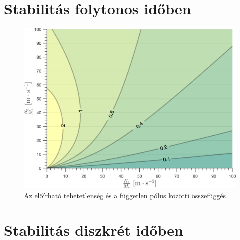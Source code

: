 \section{Stabilitás folytonos időben}
\begin{figure}[ht]
    \begin{center}
    \includegraphics[width=\textwidth]{images/time_delay_stab_map.png}
    \caption{Az előírható tehetetlenség és a független pólus közötti összefüggés}\label{fig:observer_controller_param_limits}
    \end{center}
\end{figure}

\section{Stabilitás diszkrét időben}